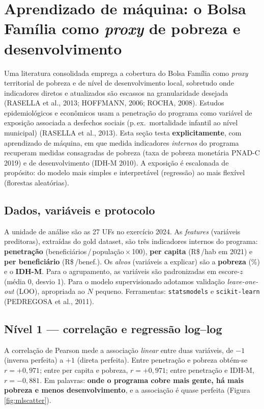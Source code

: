 \documentclass[12pt,a4paper,oneside]{article}
\newcommand{\rs}{R\$\,}
\begin{document}
\section{Aprendizado de máquina: o Bolsa Família como \textit{proxy} de pobreza e desenvolvimento}\label{sec:ml}

Uma literatura consolidada emprega a cobertura do Bolsa Família como
\textit{proxy} territorial de pobreza e de nível de desenvolvimento
local, sobretudo onde indicadores diretos e atualizados são escassos na
granularidade desejada (RASELLA et al., 2013; HOFFMANN, 2006; ROCHA, 2008). Estudos epidemiológicos e econômicos usam a penetração
do programa como variável de exposição associada a desfechos sociais
(p.\,ex.\ mortalidade infantil ao nível municipal) (RASELLA et al., 2013).
Esta seção testa \textbf{explicitamente}, com aprendizado de máquina, em
que medida indicadores \textit{internos} do programa recuperam medidas
consagradas de pobreza (taxa de pobreza monetária PNAD-C 2019) e de
desenvolvimento (IDH-M 2010). A exposição é escalonada de propósito: do
modelo mais simples e interpretável (regressão) ao mais flexível
(florestas aleatórias).

\subsection{Dados, variáveis e protocolo}

A unidade de análise são as 27 UFs no exercício 2024. As
\textit{features} (variáveis preditoras), extraídas do gold dataset, são
três indicadores internos do programa: \textbf{penetração}
(beneficiários\,/\,população\,$\times$\,100), \textbf{per capita}
(\rs/hab em 2021) e \textbf{per beneficiário} (\rs/benef.). Os
\textit{alvos} (variáveis a explicar) são a \textbf{pobreza} (\%) e o
\textbf{IDH-M}. Para o agrupamento, as variáveis são padronizadas em
escore-$z$ (média 0, desvio 1). Para o modelo supervisionado adotamos
validação \textit{leave-one-out} (LOO), apropriada ao $N$ pequeno.
Ferramentas: \texttt{statsmodels} e \texttt{scikit-learn} (PEDREGOSA et al., 2011).

\subsection{Nível 1 --- correlação e regressão log--log}

A correlação de Pearson mede a associação \textit{linear} entre duas
variáveis, de $-1$ (inversa perfeita) a $+1$ (direta perfeita). Entre
penetração e pobreza obtém-se $r = +0{,}971$; entre per capita e
pobreza, $r = +0{,}971$; entre penetração e IDH-M, $r = -0{,}881$. Em
palavras: \textbf{onde o programa cobre mais gente, há mais pobreza e
menos desenvolvimento}, e a associação é quase perfeita
(Figura \ref{fig:mlscatter}).
\end{document}
